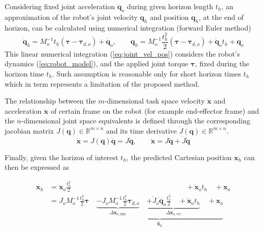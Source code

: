 Considering fixed joint acceleration $\ddot{\bm{q}}_{o}$ during given horizon length $t_h$, an approximation of the robot's joint velocity $\dot{\bm{q}}_{h}$ and position $\bm{q}_{h}$, at the end of horizon, can be calculated using numerical integration (forward Euler method) 
\begin{equation}
    \dot{\bm{q}}_{h} = M_o^{-1}t_h(\bm{\tau} - \bm{\tau}_{d,o}) + \dot{\bm{q}}_{o}, \qquad \bm{q}_{h} = M_o^{-1}\frac{t_h^2}{2}(\bm{\tau} - \bm{\tau}_{d,o}) + \dot{\bm{q}}_{o}t_h + \bm{q}_{o}
    \label{eq:joint_vel_pos}
\end{equation}
This linear numerical integration (\ref{eq:joint_vel_pos}) considers the robot's dynamics (\ref{eq:robot_model}), and the applied joint torque $\bm{\tau}$, fixed during the horizon time $t_h$. Such assumption is reasonable only for short horizon times $t_h$ which in term represents a limitation of the proposed method.

The relationship between the $m$-dimensional task space velocity $\dot{\bm{x}}$ and acceleration $\ddot{\bm{x}}$ of certain frame on the robot (for example end-effector frame) and the $n$-dimensional joint space equivalents is defined through the corresponding jacobian matrix $J(\bm{q})\in\mathbb{R}^{m\times n}$ and its time derivative $\dot{J}(\bm{q})\in\mathbb{R}^{m\times n}$. 
\begin{equation}
    \dot{\bm{x}} = J(\bm{q})\dot{\bm{q}} = J \dot{\bm{q}}, \qquad  \ddot{\bm{x}} = J \ddot{\bm{q}} + \dot{J} \dot{\bm{q}}
\end{equation}

Finally, given the horizon of interest $t_h$, the predicted Cartesian position $\bm{x}_{h}$ can then be expressed as

\begin{equation}
\begin{split}
    {\bm{x}}_{h} &= \ddot{\bm{x}}_o\frac{t_h^2}{2}   \qquad\qquad\qquad\qquad\qquad\qquad\qquad\qquad+\dot{\bm{x}}_ot_h \quad +\!  \bm{x}_o\\
    &=  J_o M_o^{-1}\frac{t_h^2}{2}\bm{\tau} \quad \underbrace{\underbrace{-
    J_o M_o^{-1}\frac{t_h^2}{2}\bm{\tau}_{d,o}}_{\Delta \bm{x}_{o,dyn}}  \quad \underbrace{ +\dot{J}_o \dot{\bm{q}}_o\frac{t_o^2}{2} \quad+ \dot{\bm{x}}_ot_h}_{\Delta \bm{x}_{o,vel}} \quad + \bm{x}_{o} }_{\hat{\bm{x}}_{h}}
    \end{split}
    \label{eq:pred_pos}
\end{equation}

